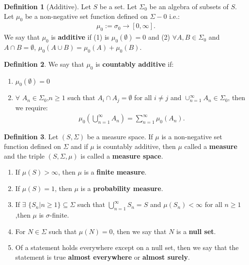 \documentclass[11pt]{article}
\theoremstyle{definition}
\newtheorem{defn}{Definition}[section]
\theoremstyle{theorem}
\begin{document}
\begin{defn}[Additive]
Let \( S \) be a set. Let \( \Sigma_0 \) be an algebra of subsets of \( S \). Let \( \mu_0 \) be a non-negative set function defined on \( \Sigma-0 \) i.e.: 
\begin{align*}
\mu_0 := \sigma_0 \rightarrow [0, \infty ].
\end{align*}
We say that \( \mu_0 \) is \textbf{additive} if (1) is \( \mu_0 ( \emptyset ) = 0 \) and (2) \( \forall A, B \in \Sigma_0 \) and \( A \cap B = \emptyset \), \( \mu_0 (A \cup B) = \mu_0(A) + \mu_0(B) \). 
\end{defn}
\begin{defn}
We say that \( \mu_0 \) is \textbf{countably additive} if:
\begin{enumerate}[noitemsep]
	\item \( \mu_0( \emptyset) = 0 \) 
	\item \( \forall \) \( A_n \in \Sigma_0 \),\( n \geq 1 \) such that \( A_i \cap A_j = \emptyset \) for all \( i \neq j \) and \( \cup_{n=1}^\infty A_n \in \Sigma_0 \), then we require: 
	\begin{align*}
		\mu_0 \left( \bigcup_{n=1}^\infty A_n \right) = \sum_{n=1}^\infty \mu_0(A_n).	
	\end{align*}
\end{enumerate}
\end{defn}

\begin{defn}
Let \( (S, \Sigma) \) be a measure space. If \( \mu \) is a non-negative set function defined on \( \Sigma \) and if \( \mu \) is countably additive, then \(\mu\) called a \textbf{measure} and the triple \( (S, \Sigma, \mu ) \) is called a \textbf{measure space}.
\begin{enumerate}[noitemsep]
	\item If \( \mu(S)>\infty \), then \( \mu \) is a \textbf{finite measure}.
	\item If \( \mu(S) = 1 \), then \( \mu\) is a \textbf{probability measure}. 
	\item If \( \exists \) \( \{ S_n | n \geq 1 \} \subseteq \Sigma \) such that \( \bigcup_{n=1}^\infty S_n = S \) and \( \mu(S_n) < \infty \) for all \( n \geq 1 \),then \( \mu \) is \( \sigma \)-finite.
	\item For \( N \in \Sigma \) such that \( \mu(N) = 0 \), then we say that \( N \) is a \textbf{null set}. 
	\item Of a statement holds everywhere except on a null set, then we say that the statement is true \textbf{almost everywhere} or \textbf{almost surely}.
\end{enumerate}
\end{defn}
\end{document}
